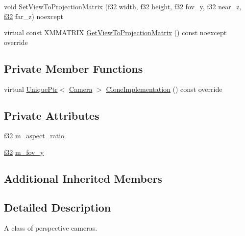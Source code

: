 \begin{DoxyCompactItemize}
\item 
void \hyperlink{classmage_1_1_perspective_camera_a54d0c432f6fd85a107ed105395eb2984}{Set\+View\+To\+Projection\+Matrix} (\hyperlink{namespacemage_a6a44ad388483959dc4dff9f2aef91431}{f32} width, \hyperlink{namespacemage_a6a44ad388483959dc4dff9f2aef91431}{f32} height, \hyperlink{namespacemage_a6a44ad388483959dc4dff9f2aef91431}{f32} fov\+\_\+y, \hyperlink{namespacemage_a6a44ad388483959dc4dff9f2aef91431}{f32} near\+\_\+z, \hyperlink{namespacemage_a6a44ad388483959dc4dff9f2aef91431}{f32} far\+\_\+z) noexcept
\item 
virtual const X\+M\+M\+A\+T\+R\+IX \hyperlink{classmage_1_1_perspective_camera_a5b733ac978a22dc58b04cf301899d575}{Get\+View\+To\+Projection\+Matrix} () const noexcept override
\end{DoxyCompactItemize}
\subsection*{Private Member Functions}
\begin{DoxyCompactItemize}
\item 
virtual \hyperlink{namespacemage_a3316d7143a973e37adf1110f2e80ca31}{Unique\+Ptr}$<$ \hyperlink{classmage_1_1_camera}{Camera} $>$ \hyperlink{classmage_1_1_perspective_camera_aa597ab884256b7e6fad63653af3ac789}{Clone\+Implementation} () const override
\end{DoxyCompactItemize}
\subsection*{Private Attributes}
\begin{DoxyCompactItemize}
\item 
\hyperlink{namespacemage_a6a44ad388483959dc4dff9f2aef91431}{f32} \hyperlink{classmage_1_1_perspective_camera_ad31d309b91a7d2e340a513bef7726a09}{m\+\_\+aspect\+\_\+ratio}
\item 
\hyperlink{namespacemage_a6a44ad388483959dc4dff9f2aef91431}{f32} \hyperlink{classmage_1_1_perspective_camera_a1cc94ee3bba3ef27f6d45c195f70173a}{m\+\_\+fov\+\_\+y}
\end{DoxyCompactItemize}
\subsection*{Additional Inherited Members}


\subsection{Detailed Description}
A class of perspective cameras. 

